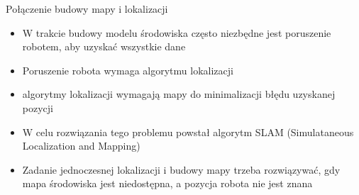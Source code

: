 \begin{frame}
{Połączenie budowy mapy i lokalizacji}
	\begin{itemize}
		\item W trakcie budowy modelu środowiska często niezbędne jest poruszenie robotem, aby uzyskać wszystkie dane
		\item Poruszenie robota wymaga algorytmu lokalizacji
		\item algorytmy lokalizacji wymagają mapy do minimalizacji błędu uzyskanej pozycji
		\item W celu rozwiązania tego problemu powstał algorytm SLAM (Simulataneous Localization and Mapping)
		\item Zadanie jednoczesnej lokalizacji i budowy mapy trzeba rozwiązywać, gdy mapa środowiska jest niedostępna, a pozycja robota nie jest znana
	\end{itemize}
\end{frame}
